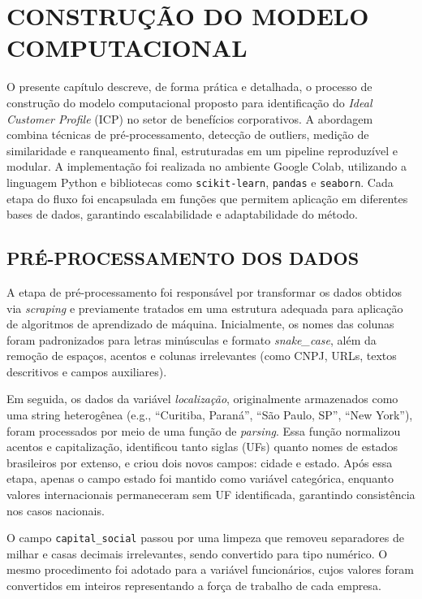 \chapter{CONSTRUÇÃO DO MODELO COMPUTACIONAL}

O presente capítulo descreve, de forma prática e detalhada, o processo de construção do modelo computacional proposto para identificação do \textit{Ideal Customer Profile} (ICP) no setor de benefícios corporativos. A abordagem combina técnicas de pré-processamento, detecção de outliers, medição de similaridade e ranqueamento final, estruturadas em um pipeline reproduzível e modular. A implementação foi realizada no ambiente Google Colab, utilizando a linguagem Python e bibliotecas como \texttt{scikit-learn}, \texttt{pandas} e \texttt{seaborn}. Cada etapa do fluxo foi encapsulada em funções que permitem aplicação em diferentes bases de dados, garantindo escalabilidade e adaptabilidade do método.

\section{PRÉ-PROCESSAMENTO DOS DADOS}

A etapa de pré-processamento foi responsável por transformar os dados obtidos via \textit{scraping} e previamente tratados em uma estrutura adequada para aplicação de algoritmos de aprendizado de máquina. Inicialmente, os nomes das colunas foram padronizados para letras minúsculas e formato \textit{snake\_case}, além da remoção de espaços, acentos e colunas irrelevantes (como CNPJ, URLs, textos descritivos e campos auxiliares).

Em seguida, os dados da variável \textit{localização}, originalmente armazenados como uma string heterogênea (e.g., ``Curitiba, Paraná'', ``São Paulo, SP'', ``New York''), foram processados por meio de uma função de \textit{parsing}. Essa função normalizou acentos e capitalização, identificou tanto siglas (UFs) quanto nomes de estados brasileiros por extenso, e criou dois novos campos: cidade e estado. Após essa etapa, apenas o campo estado foi mantido como variável categórica, enquanto valores internacionais permaneceram sem UF identificada, garantindo consistência nos casos nacionais.

O campo \texttt{capital\_social} passou por uma limpeza que removeu separadores de milhar e casas decimais irrelevantes, sendo convertido para tipo numérico. O mesmo procedimento foi adotado para a variável funcionários, cujos valores foram convertidos em inteiros representando a força de trabalho de cada empresa.

